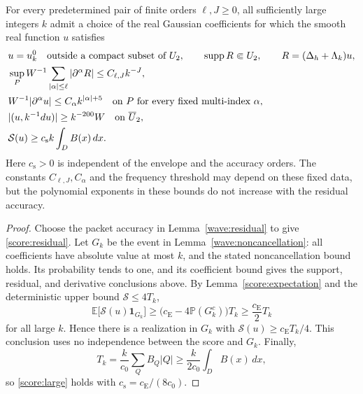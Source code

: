 \begin{proposition}\label{score:good}
For every predetermined pair of finite orders $\ell,J\ge0$, all
sufficiently large integers $k$ admit a choice of the real Gaussian
coefficients for which the smooth real function $u$ satisfies
\begin{align}
 &u=u_k^0\quad\text{outside a compact subset of }U_2,
 \qquad \operatorname{supp} R\Subset U_2,
 \qquad R=(\Delta_h+\Lambda_k)u,\label{score:support}\\
 &\sup_P W^{-1}\sum_{|\alpha|\le\ell}|\partial^\alpha R|
 \le C_{\ell,J}k^{-J},\label{score:residual}\\
 &W^{-1}|\partial^\alpha u|\le C_\alpha k^{|\alpha|+5}
 \quad\text{on }P\text{ for every fixed multi-index }\alpha,\notag\\
 &|(u,k^{-1}du)|\ge k^{-200}W
 \quad\text{on }\overline U_2,\label{score:bounds}\\
 &\mathcal S(u)\ge c_{\mathrm s}k\int_D B(x)\,dx.
 \label{score:large}
\end{align}
Here $c_{\mathrm s}>0$ is independent of the envelope and the accuracy
orders.  The constants $C_{\ell,J},C_\alpha$ and the frequency threshold
may depend on these fixed data, but the polynomial exponents in these
bounds do not increase with the residual accuracy.
\end{proposition}

\begin{proof}
Choose the packet accuracy in Lemma~\ref{wave:residual} to give
\eqref{score:residual}.  Let $G_k$ be the event in
Lemma~\ref{wave:noncancellation}: all coefficients have absolute value
at most $k$, and the stated noncancellation bound holds.  Its probability
tends to one, and its coefficient bound gives the support, residual,
and derivative conclusions above.  By Lemma~\ref{score:expectation}
and the deterministic upper bound $\mathcal S\le4T_k$,
\[
 \mathbb E\bigl[\mathcal S(u)\mathbf1_{G_k}\bigr]
 \ge\bigl(c_{\mathrm E}-4\mathbb P(G_k^c)\bigr)T_k
 \ge\frac{c_{\mathrm E}}2T_k
\]
for all large $k$.  Hence there is a realization in $G_k$ with
$\mathcal S(u)\ge c_{\mathrm E}T_k/4$.  This conclusion uses no
independence between the score and $G_k$.  Finally,
\[
 T_k=\frac{k}{c_0}\sum_QB_Q|Q|
 \ge\frac{k}{2c_0}\int_D B(x)\,dx,
\]
so \eqref{score:large} holds with
$c_{\mathrm s}=c_{\mathrm E}/(8c_0)$.
\end{proof}
